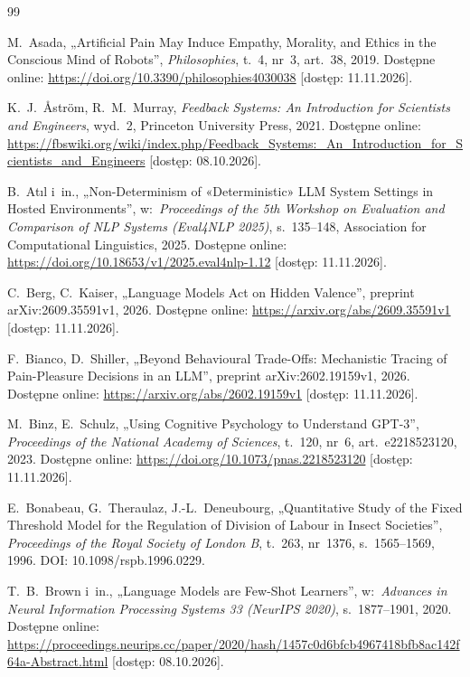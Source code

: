 \begin{thebibliography}{99}

 M.~Asada, „Artificial Pain May Induce Empathy, Morality, and Ethics in the Conscious Mind of Robots”, \textit{Philosophies}, t.~4, nr~3, art.~38, 2019. Dostępne online: \url{https://doi.org/10.3390/philosophies4030038} [dostęp: 11.11.2026].

 K.~J.~Åström, R.~M.~Murray, \textit{Feedback Systems: An Introduction for Scientists and Engineers}, wyd.~2, Princeton University Press, 2021. Dostępne online: \url{https://fbswiki.org/wiki/index.php/Feedback_Systems:_An_Introduction_for_Scientists_and_Engineers} [dostęp: 08.10.2026].

 B.~Atıl i~in., „Non-Determinism of «Deterministic» {LLM} System Settings in Hosted Environments”, w:~\textit{Proceedings of the 5th Workshop on Evaluation and Comparison of NLP Systems (Eval4NLP 2025)}, s.~135--148, Association for Computational Linguistics, 2025. Dostępne online: \url{https://doi.org/10.18653/v1/2025.eval4nlp-1.12} [dostęp: 11.11.2026].

 C.~Berg, C.~Kaiser, „Language Models Act on Hidden Valence”, preprint arXiv:2609.35591v1, 2026. Dostępne online: \url{https://arxiv.org/abs/2609.35591v1} [dostęp: 11.11.2026].

 F.~Bianco, D.~Shiller, „Beyond Behavioural Trade-Offs: Mechanistic Tracing of Pain-Pleasure Decisions in an {LLM}”, preprint arXiv:2602.19159v1, 2026. Dostępne online: \url{https://arxiv.org/abs/2602.19159v1} [dostęp: 11.11.2026].

 M.~Binz, E.~Schulz, „Using Cognitive Psychology to Understand {GPT-3}”, \textit{Proceedings of the National Academy of Sciences}, t.~120, nr~6, art.~e2218523120, 2023. Dostępne online: \url{https://doi.org/10.1073/pnas.2218523120} [dostęp: 11.11.2026].

 E.~Bonabeau, G.~Theraulaz, J.-L.~Deneubourg, „Quantitative Study of the Fixed Threshold Model for the Regulation of Division of Labour in Insect Societies”, \textit{Proceedings of the Royal Society of London B}, t.~263, nr~1376, s.~1565--1569, 1996. DOI: 10.1098/rspb.1996.0229.

 T.~B.~Brown i~in., „Language Models are Few-Shot Learners”, w:~\textit{Advances in Neural Information Processing Systems 33 (NeurIPS 2020)}, s.~1877--1901, 2020. Dostępne online: \url{https://proceedings.neurips.cc/paper/2020/hash/1457c0d6bfcb4967418bfb8ac142f64a-Abstract.html} [dostęp: 08.10.2026].


\end{thebibliography}
